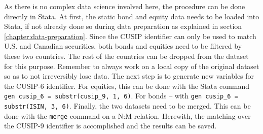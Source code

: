 As there is no complex data science involved here, the procedure can be done directly in Stata. At first, the static bond and equity data needs to be loaded into Stata, if not already done so during data preparation as explained in section \ref{chapter:data-preparation}. Since the CUSIP identifier can only be used to match U.S. and Canadian securities, both bonds and equities need to be filtered by these two countries. The rest of the countries can be dropped from the dataset for this purpose. Remember to always work on a local copy of the original dataset so as to not irreversibly lose data. The next step is to generate new variables for the CUSIP-6 identifier. For equities, this can be done with the Stata command \lstinline|gen cusip_6 = substr(cusip_9, 1, 6)|. For bonds -- with \lstinline|gen cusip_6 = substr(ISIN, 3, 6)|. Finally, the two datasets need to be merged. This can be done with the \lstinline|merge| command on a N:M relation. %
Herewith, the matching over the CUSIP-9 identifier is accomplished and the results can be saved. 

